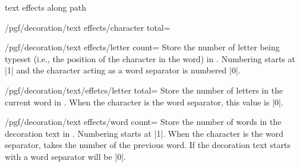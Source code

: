 \begin{decoration}{text effects along path}
\begin{key}{/pgf/decoration/text effects/character total=}
\begin{codeexample}[]
\end{codeexample}
    \end{key}

    \begin{key}{/pgf/decoration/text effects/letter count=}
        Store the number of letter being typeset (i.e., the position of the
        character in the word) in . Numbering starts at |1| and the
        character acting as a word separator is numbered |0|.
\begin{codeexample}[]
\end{codeexample}
    \end{key}

    \begin{key}{/pgf/decoration/text/effetcs/letter total=}
        Store the number of letters in the current word in . When
        the character is the word separator, this value is |0|.
    \end{key}

    \begin{key}{/pgf/decoration/text effects/word count=}
        Store the number of words in the decoration text in	.
        Numbering starts at |1|. When the character is the word separator,
         takes the number of the previous word. If the decoration
        text starts with a word separator  will be |0|.
\begin{codeexample}[]
\end{codeexample}
    \end{key}


\end{decoration}
